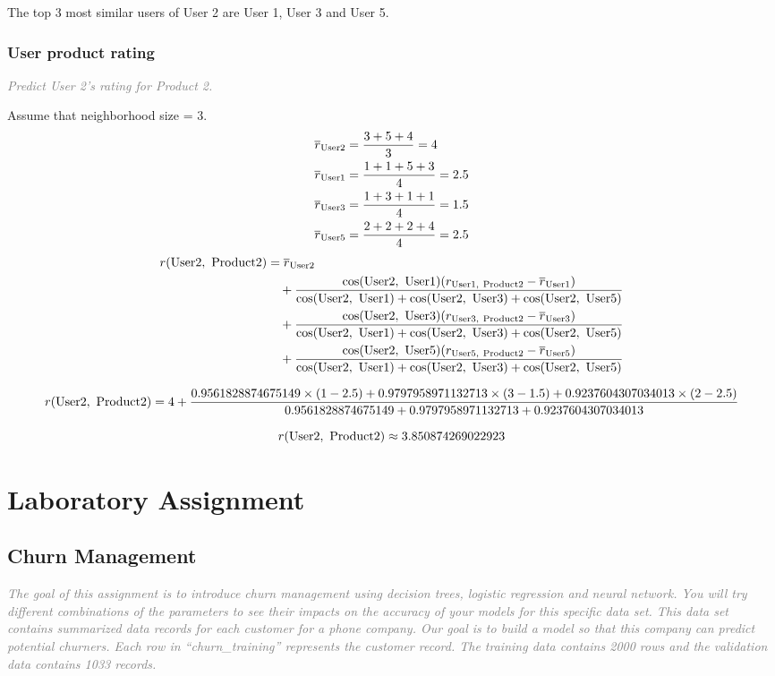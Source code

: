 \documentclass{article}
\begin{document}
The top 3 most similar users of User 2 are User 1, User 3 and User 5.



\subsubsection{User product rating}
\textcolor{gray}{\it Predict User 2's rating for Product 2.}

Assume that neighborhood size = 3.
\begin{align*}
    \overline{r}_{\rm User 2}&=\dfrac{3+5+4}{3}=4
    \\
    \overline{r}_{\rm User 1}&=\dfrac{1+1+5+3}{4}=2.5
    \\
    \overline{r}_{\rm User 3}&=\dfrac{1+3+1+1}{4}=1.5
    \\
    \overline{r}_{\rm User 5}&=\dfrac{2+2+2+4}{4}=2.5
\end{align*}
\begin{align*}
    r({\rm User 2,\ Product 2})&=\overline{r}_{\rm User 2}
    \\
    &\quad+\dfrac{\cos({\rm User 2,\ User 1})(r_{\rm User 1,\ Product 2}-\overline{r}_{\rm User 1})}{\cos({\rm User 2,\ User 1})+\cos({\rm User 2,\ User 3})+\cos({\rm User 2,\ User 5})}
    \\
    &\quad+\dfrac{\cos({\rm User 2,\ User 3})(r_{\rm User 3,\ Product 2}-\overline{r}_{\rm User 3})}{\cos({\rm User 2,\ User 1})+\cos({\rm User 2,\ User 3})+\cos({\rm User 2,\ User 5})}
    \\
    &\quad+\dfrac{\cos({\rm User 2,\ User 5})(r_{\rm User 5,\ Product 2}-\overline{r}_{\rm User 5})}{\cos({\rm User 2,\ User 1})+\cos({\rm User 2,\ User 3})+\cos({\rm User 2,\ User 5})}
\end{align*}
\begin{mathsize}
    \[ r({\rm User 2,\ Product 2})=4+\dfrac{0.9561828874675149\times(1-2.5)+0.9797958971132713\times(3-1.5)+0.9237604307034013\times(2-2.5)}{0.9561828874675149+0.9797958971132713+0.9237604307034013} \]
\end{mathsize}
\[ r({\rm User 2,\ Product 2})\approx3.850874269022923 \]





\section{Laboratory Assignment}
\subsection{Churn Management}
\textcolor{gray}{\it The goal of this assignment is to introduce churn management using decision trees, logistic regression and neural network. You will try different combinations of the parameters to see their impacts on the accuracy of your models for this specific data set. This data set contains summarized data records for each customer for a phone company. Our goal is to build a model so that this company can predict potential churners. Each row in ``churn\_training'' represents the customer record. The training data contains 2000 rows and the validation data contains 1033 records.}
\end{document}
